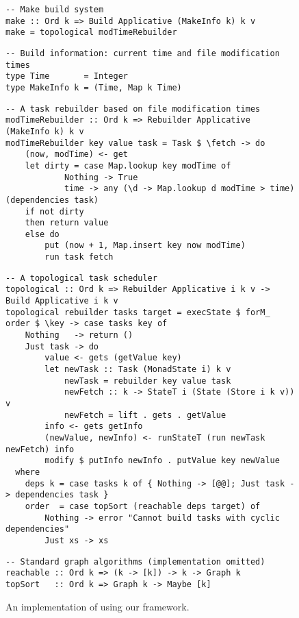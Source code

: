 \begin{figure}
\begin{verbatim}
-- Make build system
make :: Ord k => Build Applicative (MakeInfo k) k v
make = topological modTimeRebuilder
\end{verbatim}
\vspace{0mm}
\begin{verbatim}
-- Build information: current time and file modification times
type Time       = Integer
type MakeInfo k = (Time, Map k Time)
\end{verbatim}
\vspace{0mm}
\begin{verbatim}
-- A task rebuilder based on file modification times
modTimeRebuilder :: Ord k => Rebuilder Applicative (MakeInfo k) k v
modTimeRebuilder key value task = Task $ \fetch -> do
    (now, modTime) <- get
    let dirty = case Map.lookup key modTime of
            Nothing -> True
            time -> any (\d -> Map.lookup d modTime > time) (dependencies task)
    if not dirty
    then return value
    else do
        put (now + 1, Map.insert key now modTime)
        run task fetch
\end{verbatim}
\vspace{0mm}
\begin{verbatim}
-- A topological task scheduler
topological :: Ord k => Rebuilder Applicative i k v -> Build Applicative i k v
topological rebuilder tasks target = execState $ forM_ order $ \key -> case tasks key of
    Nothing   -> return ()
    Just task -> do
        value <- gets (getValue key)
        let newTask :: Task (MonadState i) k v
            newTask = rebuilder key value task
            newFetch :: k -> StateT i (State (Store i k v)) v
            newFetch = lift . gets . getValue
        info <- gets getInfo
        (newValue, newInfo) <- runStateT (run newTask newFetch) info
        modify $ putInfo newInfo . putValue key newValue
  where
    deps k = case tasks k of { Nothing -> [@@]; Just task -> dependencies task }
    order  = case topSort (reachable deps target) of
        Nothing -> error "Cannot build tasks with cyclic dependencies"
        Just xs -> xs
\end{verbatim}
\vspace{0mm}
\begin{verbatim}
-- Standard graph algorithms (implementation omitted)
reachable :: Ord k => (k -> [k]) -> k -> Graph k
topSort   :: Ord k => Graph k -> Maybe [k]
\end{verbatim}
\vspace{-2mm}
\caption{An implementation of \Make using our framework.}\label{fig-make-implementation}
\vspace{-4mm}
\end{figure}

